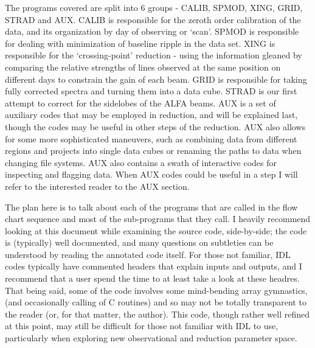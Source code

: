\documentclass[11pt]{article}
\begin{document}
The programs covered are split into 6 groups - CALIB, SPMOD, XING, GRID, STRAD and AUX. CALIB is responsible for the zeroth order calibration of the data, and its organization by day of observing or `scan'. SPMOD is responsible for dealing with minimization of baseline ripple in the data set. XING is responsible for the `crossing-point' reduction - using the information gleaned by comparing the relative strengths of lines observed at the same position on different days to constrain the gain of each beam. GRID is responsible for taking fully corrected spectra and turning them into a data cube. STRAD is our first attempt to correct for the sidelobes of the ALFA beams.  AUX is a set of auxiliary codes that may be employed in reduction, and will be explained last, though the codes may be useful in other steps of the reduction. AUX also allows for some more sophisticated maneuvers, such as combining data from different regions and projects into single data cubes or renaming the paths to data when changing file systems. AUX also contains a swath of interactive codes for inspecting and flagging data. When AUX codes could be useful in a step I will refer to the interested reader to the AUX section.

The plan here is to talk about each of the programs that are called in the flow chart sequence and most of the sub-programs that they call. I heavily recommend looking at this document while examining the source code, side-by-side; the code is (typically) well documented, and many questions on subtleties can be understood by reading the annotated code itself. For those not familiar, IDL codes typically have commented headers that explain inputs and outputs, and I recommend that a user spend the time to at least take a look at these headres. That being said, some of the code involves some mind-bending array gymnastics, (and occasionally calling of C routines) and so may not be totally transparent to the reader (or, for that matter, the author). This code, though rather well refined at this point, may still be difficult for those not familiar with IDL to use, particularly when exploring new observational and reduction parameter space.
\end{document}
